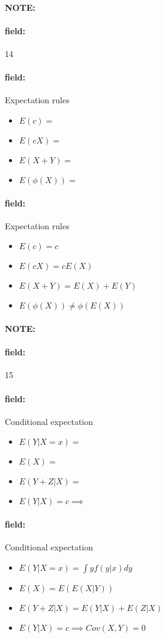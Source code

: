 \documentclass[12pt]{article}
\newenvironment{note}{\paragraph{NOTE:}}{}
\newenvironment{field}{\paragraph{field:}}{}
\begin{document}
\begin{note}
  \begin{field}
    \tiny 14
  \end{field}
  \begin{field}
    Expectation rules
    \begin{itemize}
      \item $E(c) = $
      \item $E(cX) = $
      \item $E(X + Y) = $
      \item $E(\phi(X)) = $
    \end{itemize}
  \end{field}
  \begin{field}
    Expectation rules
    \begin{itemize}
      \item $E(c) = c$
      \item $E(cX) = cE(X)$
      \item $E(X + Y) = E(X) + E(Y)$
      \item $E(\phi(X)) \neq \phi(E(X))$
    \end{itemize}
  \end{field}
\end{note}

\begin{note}
  \begin{field}
    \tiny 15
  \end{field}
  \begin{field}
    Conditional expectation
      \begin{itemize}
        \item $E(Y|X = x) = $
        \item $E(X) = $
        \item $E(Y+Z|X) = $
        \item $E(Y|X) = c \implies $
      \end{itemize}
  \end{field}
  \begin{field}
    Conditional expectation
      \begin{itemize}
        \item $E(Y|X = x) = \int y f(y|x) dy$
        \item $E(X) = E(E(X|Y))$
        \item $E(Y+Z|X) = E(Y|X) + E(Z|X)$
        \item $E(Y|X) = c \implies Cov(X,Y) = 0$
      \end{itemize}

  \end{field}
\end{note}
\end{document}
